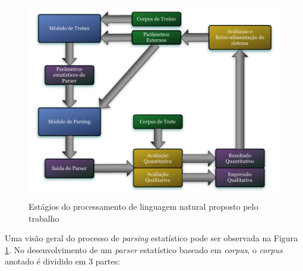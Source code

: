 \begin{figure}
	\begin{center}
		\includegraphics[scale=0.5]{parser_schema.pdf}
		\caption{\label{schema} Estágios do processamento de linguagem natural proposto pelo trabalho}		
	\end{center}
\end{figure}

Uma visão geral do processo de \emph{parsing} estatístico pode ser observada na Figura \ref{schema}. No desenvolvimento de um \emph{parser} estatístico baseado em \emph{corpus}, o \emph{corpus} anotado é dividido em 3 partes:

